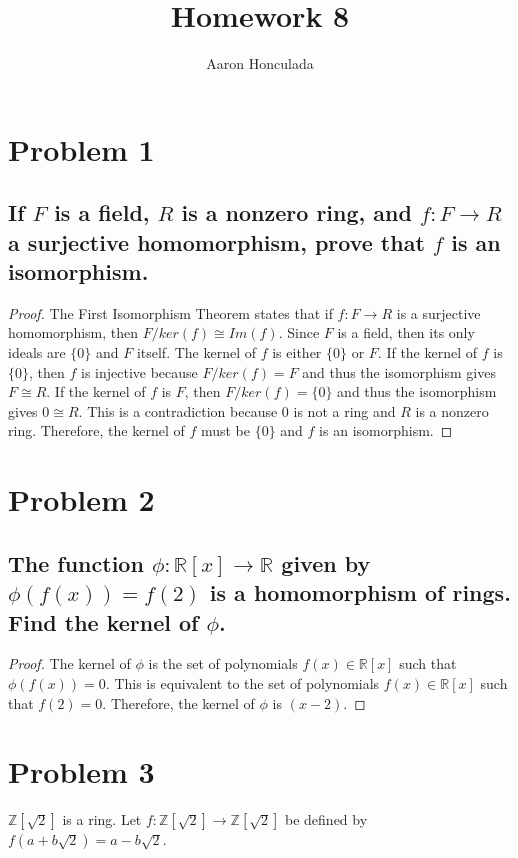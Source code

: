 \documentclass{article}
\title{Homework 8}
\author{Aaron Honculada}
\date{\monthname[\month] \the\year}
\theoremstyle{plain} %
\theoremstyle{definition} %
\begin{document}
\maketitle

\section*{Problem 1}
\subsection*{If $F$ is a field, $R$ is a nonzero ring, and $f: F \to R$ a surjective homomorphism, 
prove that $f$ is an isomorphism.}
\begin{proof}
    The First Isomorphism Theorem states that if $f: F \to R$ is a surjective homomorphism, then $F/ker(f) \cong Im(f)$.
    Since $F$ is a field, then its only ideals are $\{0\}$ and $F$ itself.
    The kernel of $f$ is either $\{0\}$ or $F$.
    If the kernel of $f$ is $\{0\}$, then $f$ is injective because $F / ker(f) = F$ and thus the isomorphism
    gives $F \cong R$.
    If the kernel of $f$ is $F$, then $F/ ker(f) = \{0\}$ and thus the isomorphism gives $0 \cong R$.
    This is a contradiction because $0$ is not a ring and $R$ is a nonzero ring.
    Therefore, the kernel of $f$ must be $\{0\}$ and $f$ is an isomorphism.
\end{proof}

\section*{Problem 2}
\subsection*{The function $\phi: \mathbb{R}[x] \to \mathbb{R}$ given by $\phi(f(x)) = f(2)$ is a homomorphism of rings. Find
the kernel of $\phi$.}
\begin{proof}
    The kernel of $\phi$ is the set of polynomials $f(x) \in \mathbb{R}[x]$ such that $\phi(f(x)) = 0$.
    This is equivalent to the set of polynomials $f(x) \in \mathbb{R}[x]$ such that $f(2) = 0$.
    Therefore, the kernel of $\phi$ is $(x-2)$.
\end{proof}

\section*{Problem 3}
$\mathbb{Z}[\sqrt{2}]$ is a ring. Let $f: \mathbb{Z}[\sqrt{2}] \to \mathbb{Z}[\sqrt{2}]$ be defined by $f(a+b\sqrt{2}) = a-b\sqrt{2}$.
\end{document}
